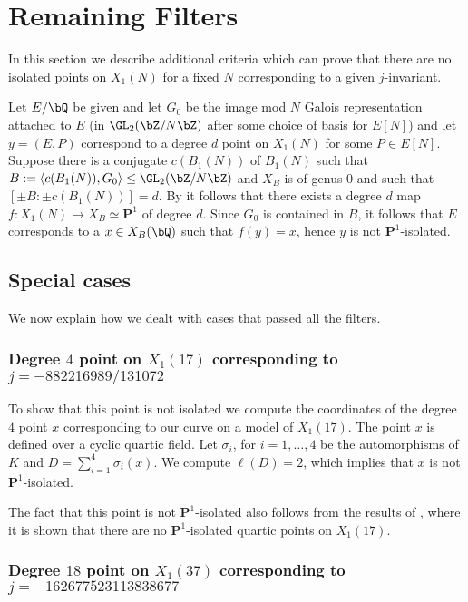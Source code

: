 \documentclass[11pt,reqno]{amsart}
\theoremstyle{plain}
\theoremstyle{definition}
\newcommand{\Q}{\bQ}
\newcommand{\Z}{\bZ}
\newcommand{\PP}{\mathbf P}
\begin{document}
\section{Remaining Filters}
In this section we describe additional criteria which can prove that there are no isolated points on $X_1(N)$ for a fixed $N$ corresponding to a given $j$-invariant. 

Let $E/\Q$ be given and let $G_0$ be the image mod $N$ Galois representation attached to $E$ (in $\GL_2(\Z/N\Z)$ after some choice of basis for $E[N]$) and let $y=(E,P)$ correspond to a degree $d$ point on $X_1(N)$ for some $P\in E[N]$. Suppose there is a conjugate $c(B_1(N))$ of $B_1(N)$ such that $B:=\langle c(B_1(N)), G_0 \rangle \leq \GL_2(\Z/N\Z)$ and $X_B$ is of genus 0 and such that $[\pm B: \pm c(B_1(N))]=d$. By  it follows that there exists a degree $d$ map $f\colon X_1(N)\rightarrow X_B\simeq \PP^1$ of degree $d$. Since $G_0$ is contained in $B$, it follows that $E$ corresponds to a  $x\in X_B(\Q)$ such that $f(y)=x$, hence $y$ is not $\PP^1$-isolated. 


\subsection{Special cases}
We now explain how we dealt with cases that passed all the filters. 

\subsubsection{Degree $4$ point on $X_1(17)$ corresponding to $j=-882216989/131072$}
To show that this point is not isolated we compute the coordinates of the degree $4$ point $x$ corresponding to our curve on a model of $X_1(17)$. The point $x$ is defined over a cyclic quartic field. Let $\sigma_i$, for $i=1,\ldots, 4$ be the automorphisms of $K$ and $D=\sum_{i=1}^4\sigma_i(x)$. We compute $\ell(D)=2$, which implies that $x$ is not $\PP^1$-isolated. 

The fact that this point is not $\PP^1$-isolated also follows from the results of \cite{DerickxMazurKamienny}, where it is shown that there are no $\PP^1$-isolated quartic points on $X_1(17)$.


\subsubsection{Degree $18$ point on $X_1(37)$ corresponding to $j=-162677523113838677$}
\end{document}

